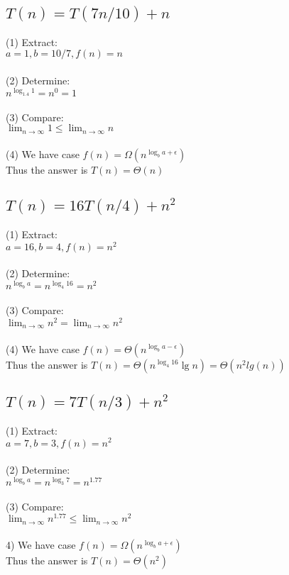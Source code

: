 \documentclass[20pt]{article} %
\begin{document}
\subsection{$T(n) = T(7n/10) + n$}

(1) Extract:
\\ \indent $a = 1, b = 10/7, f(n) = n$ 
\\ \\
(2) Determine:
\\ \indent $n^{\log_1.4 1} = n^{0} = 1$
\\ \\ 
(3) Compare:
\\ \indent  $\lim_{n\to\infty}1 \leq \lim_{n\to\infty}n$
\\ \\ 
(4) We have case $f(n) = \Omega(n^{\log_b a + \epsilon})$
\\ Thus the answer is $T(n) = \Theta(n)$

\subsection{$T(n) = 16T(n/4) + n^{2}$}

(1) Extract:
\\ \indent $a = 16, b = 4, f(n) = n^{2}$ 
\\ \\
(2) Determine:
\\ \indent $n^{\log_b a} = n^{\log_4 16} = n^{2}$
\\ \\
(3) Compare:
\\ \indent  $\lim_{n\to\infty} n^{2} = \lim_{n\to\infty}n^{2}$
\\ \\
(4) We have case $f(n) = \Theta(n^{\log_b a - \epsilon})$
\\ Thus the answer is $T(n) = \Theta(n^{\log_4 16}\lg n) = \Theta(n^{2}lg(n))$

\newpage
\subsection{$T(n) = 7T(n/3) + n^{2}$}

(1) Extract:
\\ \indent $a = 7, b = 3, f(n) = n^{2}$ 
\\ \\
(2) Determine:
\\ \indent $n^{\log_b a} = n^{\log_3 7} = n^{1.77}$
\\ \\
(3) Compare:
\\ \indent  $\lim_{n\to\infty} n^{1.77} \leq \lim_{n\to\infty}n^{2}$
\\ \\
4) We have case $f(n) = \Omega(n^{\log_b a + \epsilon})$
\\ Thus the answer is $T(n) = \Theta(n^{2})$
\end{document}
